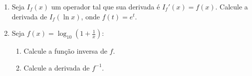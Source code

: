 \documentclass[a4paper,5pt]{amsbook}
\newcommand{\ds}{\displaystyle}
\begin{document}
\begin{enumerate}
    \vspace{0.5cm}
    \item Seja $I_{f}(x)$ um operador tal que sua derivada \'e $I_{f}'(x)=f(x)$.
        Calcule a derivada de $I_{f}(\ln{x})$, onde $f(t)=e^{t}$.

    \vspace{0.5cm}
    \item Seja $f(x)=\ds\log_{10}{\left(1+\frac{1}{x}\right)}$:
        \begin{enumerate}
            \vspace{0.3cm}
            \item Calcule a fun\c{c}\~ao inversa de $f$.
            \vspace{0.3cm}
            \item Calcule a derivada de $f^{-1}$.
        \end{enumerate}
\end{enumerate}
\end{document}
